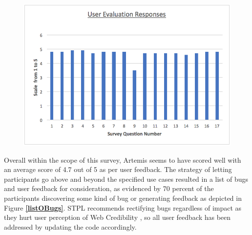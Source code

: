     \begin{figure}[h]
    	\includegraphics[scale=0.66,center]{chapters/chapter04/figures/userEvaluationGraph.png}
    \end{figure}
    
    
    
    Overall within the scope of this survey, Artemis seems to have scored well with an average score of 4.7 out of 5 as per user feedback. The strategy of letting participants go above and beyond the specified use cases resulted in a list of bugs and user feedback for consideration, as evidenced by 70 percent of the participants discovering some kind of bug or generating feedback as depicted in Figure \textbf{\ref{listOBugs}}. STPL recommends rectifying bugs regardless of impact as they hurt user perception of Web Credibility \cite{Fogg2002}, so all user feedback has been addressed by updating the code accordingly.
    
